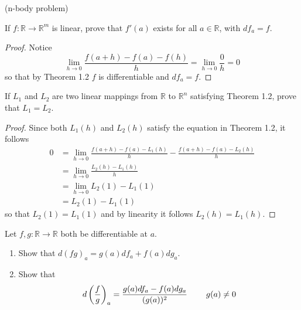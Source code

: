 \question (n-body problem)

\question If \( f: \mathbb{R} \rightarrow \mathbb{R}^m \) is linear, prove that \( f'(a) \) exists for all \( a \in \mathbb{R} \), with \(df_a = f \).

\begin{proof}
Notice
\[
\lim_{h \rightarrow 0} \frac{f(a+h)-f(a)-f(h)}{h} = \lim_{h \rightarrow 0} \frac{0}{h} = 0
\]
so that by Theorem 1.2 \( f \) is differentiable and \( df_a=f \).
\end{proof}

\question If \( L_1 \) and \( L_2 \) are two linear mappings from \( \mathbb{R} \) to \( \mathbb{R}^n \) satisfying Theorem 1.2, prove that \( L_1 = L_2 \). 
\begin{proof}
Since both \( L_1(h) \) and \( L_2(h) \) satisfy the equation in Theorem 1.2, it follows
\begin{align*}
0 &= \lim_{h \rightarrow 0} \frac{f(a+h)-f(a)-L_1(h)}{h}-\frac{f(a+h)-f(a)-L_2(h)}{h} \\
&= \lim_{h \rightarrow 0} \frac{L_2(h) - L_1(h)}{h} \\
&= \lim_{h \rightarrow 0} L_2(1)-L_1(1) \\
&= L_2(1) - L_1(1)
\end{align*}
so that \( L_2(1) = L_1(1) \) and by linearity it follows \( L_2(h) = L_1(h) \).
\end{proof}

\question Let \( f,g: \mathbb{R} \rightarrow \mathbb{R} \) both be differentiable at \( a \).
\begin{enumerate}
    \item Show that \( d(fg)_a= g(a)df_a+f(a)dg_a \).
    \item Show that 
    \[
    d\left( \frac{f}{g} \right)_a = \frac{g(a)df_a-f(a)dg_a}{(g(a))^2} \hspace{8mm} g(a) \neq 0
    \]
\end{enumerate}

